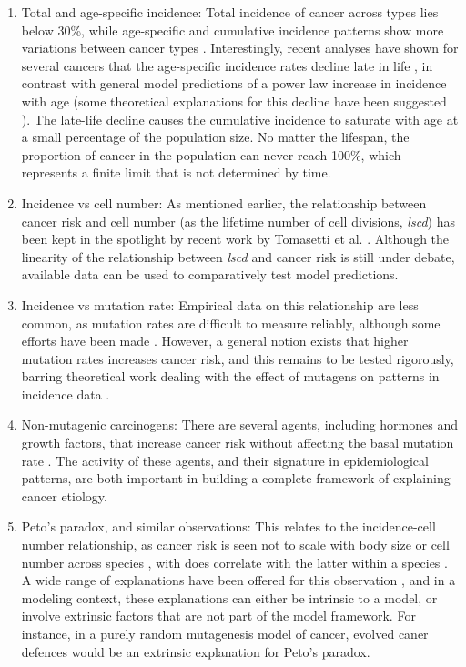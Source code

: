 \documentclass[10pt,twocolumn,twoside]{article}
\begin{document}
\begin{enumerate}
	\item Total and age-specific incidence: Total incidence of cancer across types lies below 30\%, while age-specific and cumulative incidence patterns show more variations between cancer types \cite{AmericanCancerSociety2016}. Interestingly, recent analyses have shown for several cancers that the age-specific incidence rates decline late in life \cite{Harding2012}, in contrast with general model predictions of a power law increase in incidence with age (some theoretical explanations for this decline have been suggested \cite{Frank2007}). The late-life decline causes the cumulative incidence to saturate with age at a small percentage of the population size. No matter the lifespan, the proportion of cancer in the population can never reach 100\%, which represents a finite limit that is not determined by time.
	\item Incidence vs cell number: As mentioned earlier, the relationship between cancer risk and cell number (as the lifetime number of cell divisions, \textit{lscd}) has been kept in the spotlight by recent work by Tomasetti et al. \cite{Tomasetti78, Tomasetti2017}. Although the linearity of the relationship between \textit{lscd} and cancer risk is still under debate, available data can be used to comparatively test model predictions.
	\item Incidence vs mutation rate: Empirical data on this relationship are less common, as mutation rates are difficult to measure reliably, although some efforts have been made \cite{Hao2016}. However, a general notion exists that higher mutation rates increases cancer risk, and this remains to be tested rigorously, barring theoretical work dealing with the effect of mutagens on patterns in incidence data \cite{Frank2007}.
	\item Non-mutagenic carcinogens: There are several agents, including hormones and growth factors, that increase cancer risk without affecting the basal mutation rate \cite{Tennant1993}. The activity of these agents, and their signature in epidemiological patterns, are both important in building a complete framework of explaining cancer etiology.
	\item Peto's paradox, and similar observations: This relates to the incidence-cell number relationship, as cancer risk is seen not to scale with body size or cell number across species \cite{Nagy2007}, with does correlate with the latter within a species \cite{Noble2015}. A wide range of explanations have been offered for this observation \cite{Tollis2017b}, and in a modeling context, these explanations can either be intrinsic to a model, or involve extrinsic factors that are not part of the model framework. For instance, in a purely random mutagenesis model of cancer, evolved caner defences would be an extrinsic explanation for Peto's paradox.
\end{enumerate}
\end{document}

